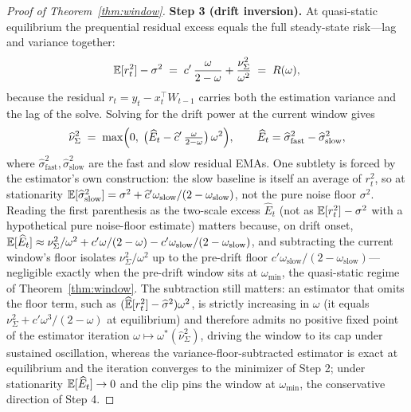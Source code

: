 \begin{proof}[Proof of Theorem~\ref{thm:window}]
\textbf{Step 3 (drift inversion).}
At quasi-static equilibrium the prequential residual excess equals the full steady-state risk---lag and variance together:
\[
  \mathbb{E}[r_t^2] - \sigma^2
  \;=\; c'\,\frac{\omega}{2-\omega} + \frac{\nu^2_\Sigma}{\omega^2}
  \;=\; R(\omega),
\]
because the residual $r_t = y_t - x_t^\top W_{t-1}$ carries both the estimation variance and the lag of the solve.
Solving for the drift power at the current window gives
\[
  \widehat\nu^2_\Sigma
  \;=\; \max\Bigl(0,\;\bigl(\widehat E_t - \widehat c'\,\tfrac{\omega}{2-\omega}\bigr)\,\omega^2\Bigr),
  \qquad
  \widehat E_t = \widehat\sigma^2_{\mathrm{fast}} - \widehat\sigma^2_{\mathrm{slow}},
\]
where $\widehat\sigma^2_{\mathrm{fast}}, \widehat\sigma^2_{\mathrm{slow}}$ are the fast and slow residual EMAs.
One subtlety is forced by the estimator's own construction: the slow baseline is itself an average of $r_t^2$, so at stationarity $\mathbb{E}[\widehat\sigma^2_{\mathrm{slow}}] = \sigma^2 + \widehat c' \omega_{\mathrm{slow}}/(2 - \omega_{\mathrm{slow}})$, not the pure noise floor $\sigma^2$.
Reading the first parenthesis as the two-scale excess $\widehat E_t$ (not as $\mathbb{E}[r_t^2] - \sigma^2$ with a hypothetical pure noise-floor estimate) matters because, on drift onset, $\mathbb{E}[\widehat E_t] \approx \nu^2_\Sigma/\omega^2 + c'\omega/(2-\omega) - c'\omega_{\mathrm{slow}}/(2-\omega_{\mathrm{slow}})$, and subtracting the current window's floor isolates $\nu^2_\Sigma/\omega^2$ up to the pre-drift floor $c'\omega_{\mathrm{slow}}/(2-\omega_{\mathrm{slow}})$---negligible exactly when the pre-drift window sits at $\omega_{\min}$, the quasi-static regime of Theorem~\ref{thm:window}.
The subtraction still matters: an estimator that omits the floor term, such as $(\widehat{\mathbb{E}}[r_t^2] - \widehat\sigma^2)\omega^2$, is strictly increasing in $\omega$ (it equals $\nu^2_\Sigma + c'\omega^3/(2-\omega)$ at equilibrium) and therefore admits no positive fixed point of the estimator iteration $\omega \mapsto \omega^*(\widehat\nu^2_\Sigma)$, driving the window to its cap under sustained oscillation, whereas the variance-floor-subtracted estimator is exact at equilibrium and the iteration converges to the minimizer of Step 2; under stationarity $\mathbb{E}[\widehat E_t] \to 0$ and the clip pins the window at $\omega_{\min}$, the conservative direction of Step 4.


\end{proof}
